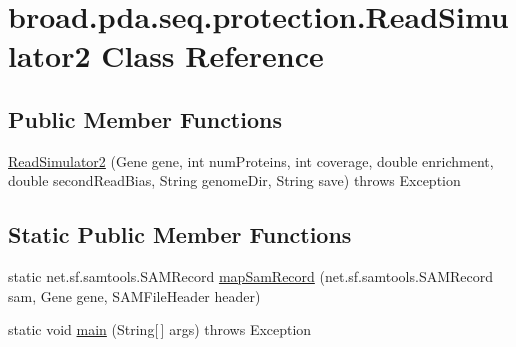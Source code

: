 \hypertarget{classbroad_1_1pda_1_1seq_1_1protection_1_1_read_simulator2}{\section{broad.\+pda.\+seq.\+protection.\+Read\+Simulator2 Class Reference}
\label{classbroad_1_1pda_1_1seq_1_1protection_1_1_read_simulator2}
}
\subsection*{Public Member Functions}
\begin{DoxyCompactItemize}
\item 
\hyperlink{classbroad_1_1pda_1_1seq_1_1protection_1_1_read_simulator2_a148cbbf67eb520d112beb0069e4f0c8d}{Read\+Simulator2} (Gene gene, int num\+Proteins, int coverage, double enrichment, double second\+Read\+Bias, String genome\+Dir, String save)  throws Exception
\end{DoxyCompactItemize}
\subsection*{Static Public Member Functions}
\begin{DoxyCompactItemize}
\item 
static net.\+sf.\+samtools.\+S\+A\+M\+Record \hyperlink{classbroad_1_1pda_1_1seq_1_1protection_1_1_read_simulator2_a77952d9aaf8a80ac415a7f9f7e00d474}{map\+Sam\+Record} (net.\+sf.\+samtools.\+S\+A\+M\+Record sam, Gene gene, S\+A\+M\+File\+Header header)
\item 
static void \hyperlink{classbroad_1_1pda_1_1seq_1_1protection_1_1_read_simulator2_a6f7810919b0b5fe028d3742764cf7bb0}{main} (String\mbox{[}$\,$\mbox{]} args)  throws Exception
\end{DoxyCompactItemize}


